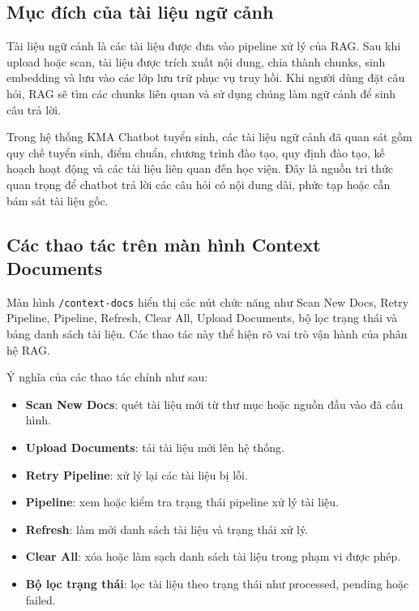 \documentclass[12pt,a4paper]{report}
\begin{document}
\subsection{Mục đích của tài liệu ngữ cảnh}

Tài liệu ngữ cảnh là các tài liệu được đưa vào pipeline xử lý của RAG. Sau khi upload hoặc scan, tài liệu được trích xuất nội dung, chia thành chunks, sinh embedding và lưu vào các lớp lưu trữ phục vụ truy hồi. Khi người dùng đặt câu hỏi, RAG sẽ tìm các chunks liên quan và sử dụng chúng làm ngữ cảnh để sinh câu trả lời.

Trong hệ thống KMA Chatbot tuyển sinh, các tài liệu ngữ cảnh đã quan sát gồm quy chế tuyển sinh, điểm chuẩn, chương trình đào tạo, quy định đào tạo, kế hoạch hoạt động và các tài liệu liên quan đến học viện. Đây là nguồn tri thức quan trọng để chatbot trả lời các câu hỏi có nội dung dài, phức tạp hoặc cần bám sát tài liệu gốc.

\subsection{Các thao tác trên màn hình Context Documents}

Màn hình \texttt{/context-docs} hiển thị các nút chức năng như Scan New Docs, Retry Pipeline, Pipeline, Refresh, Clear All, Upload Documents, bộ lọc trạng thái và bảng danh sách tài liệu. Các thao tác này thể hiện rõ vai trò vận hành của phân hệ RAG.

Ý nghĩa của các thao tác chính như sau:

\begin{itemize}
    \item \textbf{Scan New Docs}: quét tài liệu mới từ thư mục hoặc nguồn đầu vào đã cấu hình.
    \item \textbf{Upload Documents}: tải tài liệu mới lên hệ thống.
    \item \textbf{Retry Pipeline}: xử lý lại các tài liệu bị lỗi.
    \item \textbf{Pipeline}: xem hoặc kiểm tra trạng thái pipeline xử lý tài liệu.
    \item \textbf{Refresh}: làm mới danh sách tài liệu và trạng thái xử lý.
    \item \textbf{Clear All}: xóa hoặc làm sạch danh sách tài liệu trong phạm vi được phép.
    \item \textbf{Bộ lọc trạng thái}: lọc tài liệu theo trạng thái như processed, pending hoặc failed.
\end{itemize}
\end{document}
